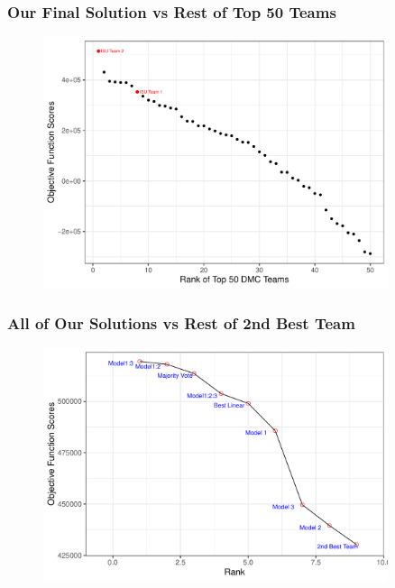 \documentclass{beamer}
\begin{document}
\begin{frame}
\frametitle{Our Final Solution vs Rest of Top 50 Teams}

	\begin{figure}[H]
		\centering
		\includegraphics[width = 0.9\textwidth]{figure/rank_top_50.pdf}
	\end{figure}	

\end{frame}



\begin{frame}
\frametitle{All of Our Solutions vs Rest of 2nd Best Team}

	\begin{figure}[H]
		\centering
		\includegraphics[width = 0.9\textwidth]{figure/rank_our_models.pdf}
	\end{figure}	

\end{frame}
\end{document}
